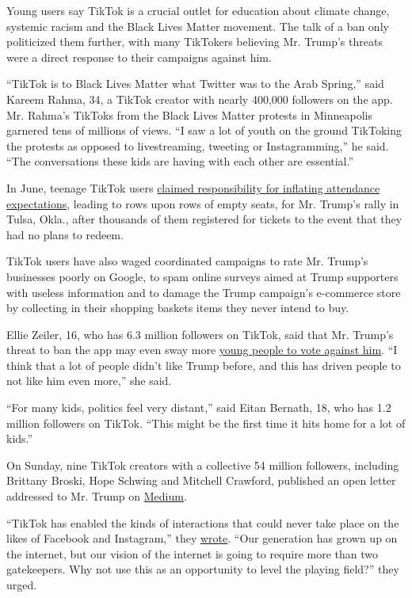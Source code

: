 Young users say TikTok is a crucial outlet for education about climate
change, systemic racism and the Black Lives Matter movement. The talk of
a ban only politicized them further, with many TikTokers believing Mr.
Trump's threats were a direct response to their campaigns against him.

``TikTok is to Black Lives Matter what Twitter was to the Arab Spring,''
said Kareem Rahma, 34, a TikTok creator with nearly 400,000 followers on
the app. Mr. Rahma's TikToks from the Black Lives Matter protests in
Minneapolis garnered tens of millions of views. ``I saw a lot of youth
on the ground TikToking the protests as opposed to livestreaming,
tweeting or Instagramming,'' he said. ``The conversations these kids are
having with each other are essential.''

In June, teenage TikTok users
\href{https://www.nytimes.com/2020/06/21/style/tiktok-trump-rally-tulsa.html}{claimed
responsibility for inflating attendance expectations}, leading to rows
upon rows of empty seats, for Mr. Trump's rally in Tulsa, Okla., after
thousands of them registered for tickets to the event that they had no
plans to redeem.

TikTok users have also waged coordinated campaigns to rate Mr. Trump's
businesses poorly on Google, to spam online surveys aimed at Trump
supporters with useless information and to damage the Trump campaign's
e-commerce store by collecting in their shopping baskets items they
never intend to buy.

Ellie Zeiler, 16, who has 6.3 million followers on TikTok, said that Mr.
Trump's threat to ban the app may even sway more
\href{https://www.nbcnews.com/news/us-news/trump-s-threatened-tiktok-ban-could-motivate-young-users-vote-n1235587}{young
people to vote against him}. ``I think that a lot of people didn't like
Trump before, and this has driven people to not like him even more,''
she said.

``For many kids, politics feel very distant,'' said Eitan Bernath, 18,
who has 1.2 million followers on TikTok. ``This might be the first time
it hits home for a lot of kids.''

On Sunday, nine TikTok creators with a collective 54 million followers,
including Brittany Broski, Hope Schwing and Mitchell Crawford, published
an open letter addressed to Mr. Trump on
\href{https://medium.com/@whoismax/dear-president-trump-an-open-letter-from-the-tiktok-creator-community-e56b21c682fb}{Medium}.

``TikTok has enabled the kinds of interactions that could never take
place on the likes of Facebook and Instagram,'' they
\href{https://medium.com/@whoismax/dear-president-trump-an-open-letter-from-the-tiktok-creator-community-e56b21c682fb}{wrote}.
``Our generation has grown up on the internet, but our vision of the
internet is going to require more than two gatekeepers. Why not use this
as an opportunity to level the playing field?'' they urged.

